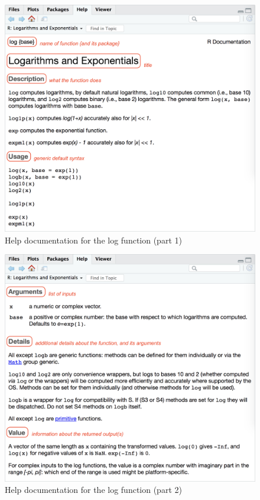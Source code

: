 \documentclass[
]{book}
\begin{document}
\begin{figure}

{\centering \includegraphics[width=0.8\linewidth]{images/rstudio/help-log-1} 

}

\caption{Help documentation for the log function (part 1)}\label{fig:unnamed-chunk-20}
\end{figure}

\begin{figure}

{\centering \includegraphics[width=0.8\linewidth]{images/rstudio/help-log-2} 

}

\caption{Help documentation for the log function (part 2)}\label{fig:unnamed-chunk-21}
\end{figure}
\end{document}

